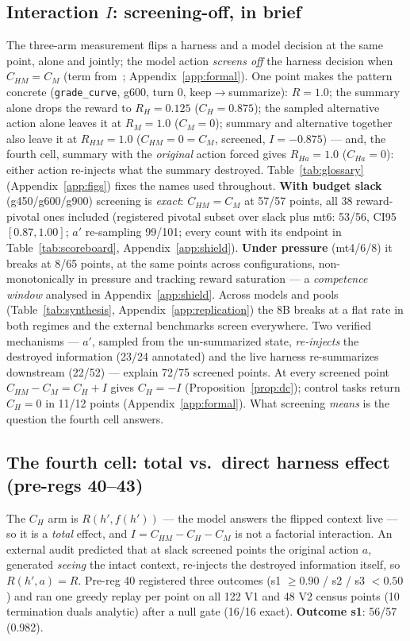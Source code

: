 \documentclass{article}
\theoremstyle{remark}
\begin{document}
\subsection{Interaction $I$: screening-off, in brief}
\label{sec:interaction}
The three-arm measurement flips a harness and a model decision at the
same point, alone and jointly; the model action \emph{screens off} the
harness decision when $C_{HM} = C_M$ (term
from~\citealp{reichenbach1956}; Appendix~\ref{app:formal}). One point
makes the pattern concrete (\texttt{grade\_curve}, g600, turn 0,
keep$\to$summarize): $R = 1.0$; the summary alone drops the reward to
$R_H = 0.125$ ($C_H = 0.875$); the sampled alternative action alone
leaves it at $R_M = 1.0$ ($C_M = 0$); summary and alternative together
also leave it at $R_{HM} = 1.0$ ($C_{HM} = 0 = C_M$, screened, $I =
-0.875$) --- and, the fourth cell, summary with the \emph{original}
action forced gives $R_{Ha} = 1.0$ ($C_{Ha} = 0$): either action
re-injects what the summary destroyed.
Table~\ref{tab:glossary} (Appendix~\ref{app:figs}) fixes the names used throughout. \textbf{With
budget slack} (g450/g600/g900) screening is \emph{exact}: $C_{HM} = C_M$
at 57/57 points, all 38 reward-pivotal ones included (registered pivotal
subset over slack plus mt6: 53/56, CI95 $[0.87,1.00]$; $a'$ re-sampling
99/101; every count with its endpoint in Table~\ref{tab:scoreboard},
Appendix~\ref{app:shield}). \textbf{Under pressure} (mt4/6/8) it breaks
at 8/65 points, at the same points across configurations,
non-monotonically in pressure and tracking reward saturation --- a
\emph{competence window} analysed in Appendix~\ref{app:shield}. Across models and pools
(Table~\ref{tab:synthesis}, Appendix~\ref{app:replication}) the 8B
breaks at a flat rate in both regimes and the external benchmarks screen
everywhere. Two verified mechanisms --- $a'$, sampled from the
un-summarized state, \emph{re-injects} the destroyed information (23/24
annotated) and the live harness re-summarizes downstream (22/52) ---
explain 72/75 screened points. At every screened point $C_{HM}-C_M = C_H
+ I$ gives $C_H = -I$ (Proposition~\ref{prop:dc}); control tasks return
$C_H = 0$ in 11/12 points (Appendix~\ref{app:formal}). What screening
\emph{means} is the question the fourth cell answers.


\subsection{The fourth cell: total vs.\ direct harness effect (pre-regs 40--43)}
\label{sec:mediation}
The $C_H$ arm is $R(h', f(h'))$ --- the model answers the flipped
context live --- so it is a \emph{total} effect, and $I = C_{HM} - C_H -
C_M$ is not a factorial interaction. An external audit predicted that at
slack screened points the original action $a$, generated \emph{seeing}
the intact context, re-injects the destroyed information itself, so
$R(h',a) = R$. Pre-reg 40 registered three outcomes (s1 $\geq 0.90$ / s2
/ s3 $< 0.50$) and ran one greedy replay per point on all 122 V1 and 48
V2 census points (10 termination duals analytic) after a null gate
(16/16 exact). \textbf{Outcome s1}: 56/57 (0.982).
\end{document}
